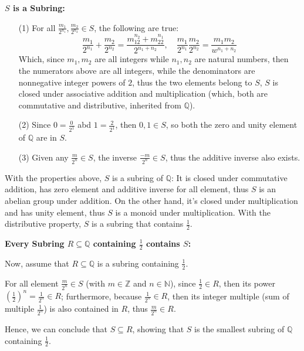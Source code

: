 \documentclass{article}
\begin{document}
\textbf{$S$ is a Subring:}
\begin{itemize}
    \item[(1)] For all $\frac{m_1}{2^{n_1}},\frac{m_2}{2^{n_2}}\in S$, the following are true:
    $$\frac{m_1}{2^{n_1}}+\frac{m_2}{2^{n_2}}=\frac{m_12^{n_2}+m_22^{n_1}}{2^{n_1+n_2}},\quad \frac{m_1}{2^{n_1}}\frac{m_2}{2^{n_2}}=\frac{m_1m_2}{w^{n_1+n_2}}$$
    Which, since $m_1,m_2$ are all integers while $n_1,n_2$ are natural numbers, then the numerators above are all integers, while the denominators are nonnegative integer powers of $2$,
    thus the two elements belong to $S$, $S$ is closed under associative addition and multiplication (which, both are commutative and distributive, inherited from $\mathbb{Q}$).

    \hfill

    \item[(2)] Since $0 = \frac{0}{2^1}$ abd $1=\frac{2}{2^1}$, then $0,1\in S$, so both the zero and unity element of $\mathbb{Q}$ are in $S$.
    
    \hfill

    \item[(3)] Given any $\frac{m}{2^n}\in S$, the inverse $\frac{-m}{2^n}\in S$, thus the additive inverse also exists.
\end{itemize}

With the properties above, $S$ is a subring of $\mathbb{Q}$:
It is closed under commutative addition, has zero element and additive inverse for all element, thus $S$ is an abelian group under addition.
On the other hand, it's closed under multiplication and has unity element, thus $S$ is a monoid under multiplication.
With the distributive property, $S$ is a subring that contains $\frac{1}{2}$.

\hfill

\textbf{Every Subring $R\subseteq \mathbb{Q}$ containing $\frac{1}{2}$ contains $S$:}

Now, assume that $R\subseteq \mathbb{Q}$ is a subring containing $\frac{1}{2}$.

For all element $\frac{m}{2^n}\in S$ (with $m\in\mathbb{Z}$ and $n\in\mathbb{N}$), since $\frac{1}{2}\in R$, then its power $(\frac{1}{2})^n = \frac{1}{2^n}\in R$;
furthermore, because $\frac{1}{2^n}\in R$, then its integer multiple (sum of multiple $\frac{1}{2^n}$) is also contained in $R$, thus $\frac{m}{2^n}\in R$.

Hence, we can conclude that $S\subseteq R$, showing that $S$ is the smallest subring of $\mathbb{Q}$ containing $\frac{1}{2}$.
\end{document}
